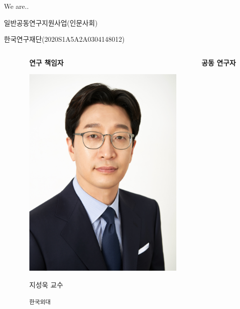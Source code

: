 \documentclass[
  ignorenonframetext,
]{beamer}
\begin{document}
\begin{frame}[fragile]{We are..}
\protect\hypertarget{we-are..}{}
\begin{block}{일반공동연구지원사업(인문사회)}
\protect\hypertarget{uxc77cuxbc18uxacf5uxb3d9uxc5f0uxad6cuxc9c0uxc6d0uxc0acuxc5c5uxc778uxbb38uxc0acuxd68c}{}
\begin{block}{한국연구재단(2020S1A5A2A0304148012)}
\protect\hypertarget{uxd55cuxad6duxc5f0uxad6cuxc7acuxb2e82020s1a5a2a0304148012}{}
\begin{columns}[T]
\begin{column}{0.23\textwidth}
\end{column}

\begin{column}{0.18\textwidth}
\textbf{연구 책임자}

\includegraphics[width=3.125in,height=\textheight]{img/ji.gif}

\begin{block}{지성욱 교수}
\protect\hypertarget{uxc9c0uxc131uxc6b1-uxad50uxc218}{}
\end{block}

\begin{block}{\texttt{한국외대}}
\protect\hypertarget{uxd55cuxad6duxc678uxb300}{}
\end{block}
\end{column}

\begin{column}{0.18\textwidth}
\textbf{공동 연구자}


\end{column}
\end{columns}
\end{block}
\end{block}
\end{frame}
\end{document}
